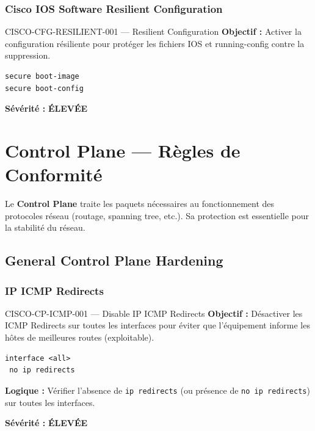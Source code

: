 \documentclass[12pt, a4paper]{report}
\begin{document}
\subsection{Cisco IOS Software Resilient Configuration}

\begin{rulebox}{CISCO-CFG-RESILIENT-001 — Resilient Configuration}
  \textbf{Objectif :} Activer la configuration résiliente pour protéger les fichiers IOS et running-config contre la suppression.

  \begin{lstlisting}
secure boot-image
secure boot-config
  \end{lstlisting}

  \textbf{Sévérité :} \textcolor{accentOrange}{\textbf{ÉLEVÉE}}
\end{rulebox}

\chapter{Control Plane — Règles de Conformité}

Le \textbf{Control Plane} traite les paquets nécessaires au fonctionnement des protocoles réseau (routage, spanning tree, etc.). Sa protection est essentielle pour la stabilité du réseau.

\section{General Control Plane Hardening}

\subsection{IP ICMP Redirects}

\begin{rulebox}{CISCO-CP-ICMP-001 — Disable IP ICMP Redirects}
  \textbf{Objectif :} Désactiver les ICMP Redirects sur toutes les interfaces pour éviter que l'équipement informe les hôtes de meilleures routes (exploitable).

  \begin{lstlisting}
interface <all>
 no ip redirects
  \end{lstlisting}

  \textbf{Logique :} Vérifier l'absence de \texttt{ip redirects} (ou présence de \texttt{no ip redirects}) sur toutes les interfaces.

  \textbf{Sévérité :} \textcolor{accentOrange}{\textbf{ÉLEVÉE}}
\end{rulebox}
\end{document}
